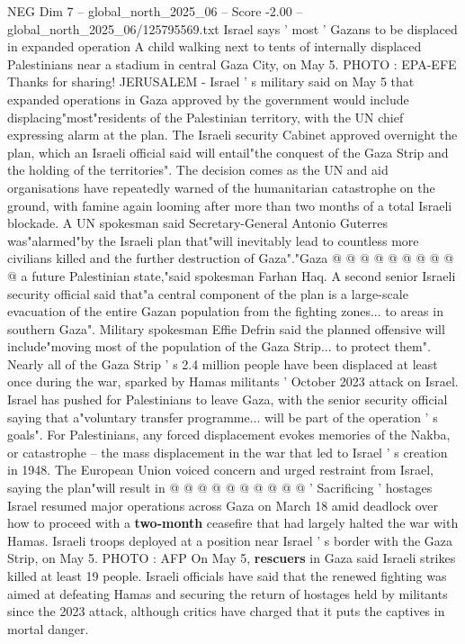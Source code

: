 \begin{textsample}{NEG Dim 7 – global\_north\_2025\_06 – Score -2.00 – global\_north\_2025\_06/125795569.txt}  \label{ex:f7_neg_079}
Israel says ' most ' Gazans to be displaced in expanded operation A child walking next to tents of internally displaced Palestinians near a stadium in central Gaza City, on May 5.
PHOTO : EPA-EFE Thanks for sharing!
JERUSALEM - Israel ' s military said on May 5 that expanded operations in Gaza approved by the government would include displacing"most"residents of the Palestinian territory, with the UN chief expressing alarm at the plan.
The Israeli security Cabinet approved overnight the plan, which an Israeli official said will entail"the conquest of the Gaza Strip and the holding of the territories".
The decision comes as the UN and aid organisations have repeatedly warned of the humanitarian catastrophe on the ground, with famine again looming after more than two months of a total Israeli blockade.
A UN spokesman said Secretary-General Antonio Guterres was"alarmed"by the Israeli plan that"will inevitably lead to countless more civilians killed and the further destruction of Gaza"."Gaza @ @ @ @ @ @ @ @ @ @ a future Palestinian state,"said spokesman Farhan Haq.
A second senior Israeli security official said that"a central component of the plan is a large-scale evacuation of the entire Gazan population from the fighting zones... to areas in southern Gaza".
Military spokesman Effie Defrin said the planned offensive will include"moving most of the population of the Gaza Strip... to protect them".
Nearly all of the Gaza Strip ' s 2.4 million people have been displaced at least once during the war, sparked by Hamas militants ' October 2023 attack on Israel.
Israel has pushed for Palestinians to leave Gaza, with the senior security official saying that a"voluntary transfer programme... will be part of the operation ' s goals".
For Palestinians, any forced displacement evokes memories of the Nakba, or catastrophe -- the mass displacement in the war that led to Israel ' s creation in 1948.
The European Union voiced concern and urged restraint from Israel, saying the plan"will result in @ @ @ @ @ @ @ @ @ @ ' Sacrificing ' hostages Israel resumed major operations across Gaza on March 18 amid deadlock over how to proceed with a \textbf{two-month} ceasefire that had largely halted the war with Hamas.
Israeli troops deployed at a position near Israel ' s border with the Gaza Strip, on May 5.
PHOTO : AFP On May 5, \textbf{rescuers} in Gaza said Israeli strikes killed at least 19 people.
Israeli officials have said that the renewed fighting was aimed at defeating Hamas and securing the return of hostages held by militants since the 2023 attack, although critics have charged that it puts the captives in mortal danger.

\end{textsample}

